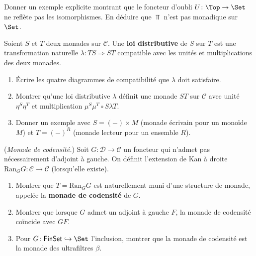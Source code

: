 \begin{exercice}\label{exo:beck-top}
Donner un exemple explicite montrant que le foncteur d'oubli
$U \colon \Top \to \Set$ ne reflète pas les isomorphismes.
En déduire que $\Top$ n'est pas monadique sur $\Set$.
\end{exercice}

\begin{exercice}\label{exo:distributive-law}
Soient $S$ et $T$ deux monades sur $\mathcal{C}$.
Une \textbf{loi distributive} de $S$ sur $T$ est une
transformation naturelle $\lambda \colon TS \Rightarrow ST$ compatible
avec les unités et multiplications des deux monades.
\begin{enumerate}[label=(\alph*)]
\item Écrire les quatre diagrammes de compatibilité que $\lambda$ doit
    satisfaire.
\item Montrer qu'une loi distributive $\lambda$ définit une monade
    $ST$ sur $\mathcal{C}$ avec unité $\eta^S \eta^T$ et multiplication
    $\mu^S \mu^T \circ S\lambda T$.
\item Donner un exemple avec $S = (-) \times M$ (monade écrivain pour
    un monoïde $M$) et $T = (-)^R$ (monade lecteur pour un ensemble $R$).
\end{enumerate}
\end{exercice}

\begin{exercice}\label{exo:monade-codensity}
(\emph{Monade de codensité.})
Soit $G \colon \mathcal{D} \to \mathcal{C}$ un foncteur qui
n'admet pas nécessairement d'adjoint à gauche.
On définit l'extension de Kan à droite
$\mathrm{Ran}_G G \colon \mathcal{C} \to \mathcal{C}$ (lorsqu'elle existe).
\begin{enumerate}[label=(\alph*)]
\item Montrer que $T = \mathrm{Ran}_G G$ est naturellement muni d'une
    structure de monade, appelée la \textbf{monade de codensité} de $G$.
\item Montrer que lorsque $G$ admet un adjoint à gauche $F$,
    la monade de codensité coïncide avec $GF$.
\item Pour $G \colon \mathsf{FinSet} \hookrightarrow \Set$ l'inclusion,
    montrer que la monade de codensité est la monade des ultrafiltres $\beta$.
\end{enumerate}
\end{exercice}

